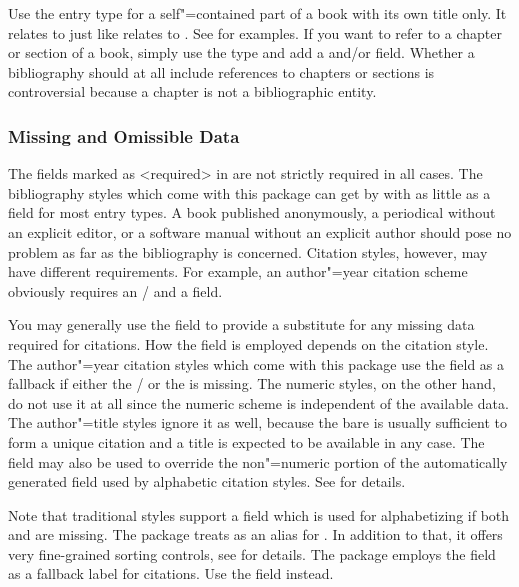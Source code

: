 \documentclass{ltxdockit}[2011/03/25]
\newcommand*{\biblatex}{\sty{biblatex}\xspace}
\begin{document}
Use the  entry type for a self"=contained part of a book with its own title only. It relates to  just like  relates to . See  for examples. If you want to refer to a chapter or section of a book, simply use the  type and add a  and\slash or  field. Whether a bibliography should at all include references to chapters or sections is controversial because a chapter is not a bibliographic entity.

\subsubsection{Missing and Omissible Data}
\label{bib:use:key}

The fields marked as <required> in  are not strictly required in all cases. The bibliography styles which come with this package can get by with as little as a  field for most entry types. A book published anonymously, a periodical without an explicit editor, or a software manual without an explicit author should pose no problem as far as the bibliography is concerned. Citation styles, however, may have different requirements. For example, an author"=year citation scheme obviously requires an \slash {} and a  field.

You may generally use the  field to provide a substitute for any missing data required for citations. How the  field is employed depends on the citation style. The author"=year citation styles which come with this package use the  field as a fallback if either the \slash {} or the  is missing. The numeric styles, on the other hand, do not use it at all since the numeric scheme is independent of the available data. The author"=title styles ignore it as well, because the bare  is usually sufficient to form a unique citation and a title is expected to be available in any case. The  field may also be used to override the non"=numeric portion of the automatically generated  field used by alphabetic citation styles. See  for details.

Note that traditional \bibtex styles support a  field which is used for alphabetizing if both  and  are missing. The \biblatex package treats  as an alias for . In addition to that, it offers very fine-grained sorting controls, see  for details. The  package employs the  field as a fallback label for citations. Use the  field instead.
\end{document}
